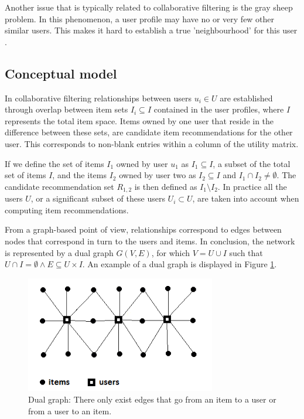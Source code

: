 \documentclass[a4paper,10pt,twocolumn]{article}
\begin{document}
Another issue that is typically related to collaborative filtering is the gray sheep problem. In this phenomenon, a user profile may have no or very few other similar users. This makes it hard to establish a true 'neighbourhood' for this user \cite{zhao2010}.


\subsection*{Conceptual model}


In collaborative filtering relationships between users $u_{i} \in U$ are established through overlap between item sets $I_{i} \subseteq I$ contained in the user profiles, where $I$ represents the total item space. Items owned by one user that reside in the difference between these sets, are candidate item recommendations for the other user. This corresponds to non-blank entries within a column of the utility matrix.

If we define the set of items $I_{1}$ owned by user $u_{1}$ as $I_{1} \subseteq I$, a subset of the total set of items $I$, and the items $I_{2}$ owned by user two as $I_{2} \subseteq I$ and $I_{1} \cap I_{2} \neq \emptyset$. The candidate recommendation set $R_{1,2}$ is then defined as $I_{1} \setminus I_{2}$. In practice all the users $U$, or a significant subset of these users $U_{i} \subset U$, are taken into account when computing item recommendations.

From a graph-based point of view, relationships correspond to edges between nodes that correspond in turn to the users and items. In conclusion, the network is represented by a dual graph $G(V,E)$, for which $V = U \cup I$ such that $U \cap I = \emptyset \wedge E \subseteq U \times I$. An example of a dual graph is displayed in Figure \ref{fig:dualgraph}.

\begin{figure}[!ht]
  \begin{center}
  	
    \includegraphics[width=8.3cm]{data/dual-graph}
  \end{center}
  \caption{Dual graph: There only exist edges that go from an item to a user or from a user to an item.}
  \label{fig:dualgraph}
\end{figure}
\end{document}
